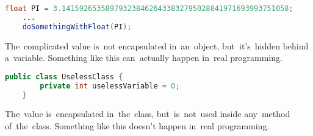 \begin{lstlisting}[language=Java]
    float PI = 3.1415926535897932384626433832795028841971693993751058;
    ...
    doSomethingWithFloat(PI);
\end{lstlisting}

\noindent The~complicated value is~not encapsulated in~an~object, but~it's~hidden behind a~variable.
Something like this can~actually happen in~real programming.

\begin{lstlisting}[language=Java]
    public class UselessClass {
        private int uselessVariable = 0;
    }
\end{lstlisting}

\noindent The~value is~encapsulated in~the~class, but~is~not~used inside any~method of~the~class.
Something like this doesn't happen in~real programming.

